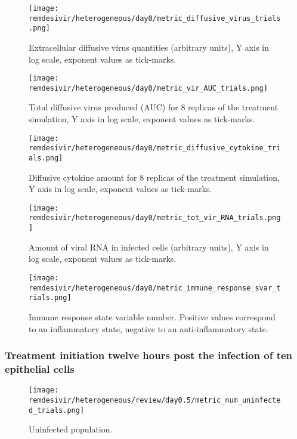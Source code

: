 \begin{figure}[H]
\texttt{[image: remdesivir/heterogeneous/day0/metric\_diffusive\_virus\_trials.png]}
\caption{Extracellular diffusive virus quantities (arbitrary units), Y axis in log scale, exponent values as tick-marks.\label{fig:app:hetero_regular:day0:diff_vir}}
\end{figure}

\begin{figure}[H]
\texttt{[image: remdesivir/heterogeneous/day0/metric\_vir\_AUC\_trials.png]}
\caption{Total diffusive virus produced (AUC) for 8 replicas of the treatment simulation, Y axis in log scale, exponent values as tick-marks.\label{fig:app:hetero_regular:day0:auc_vir}}
\end{figure}

\begin{figure}[H]
\texttt{[image: remdesivir/heterogeneous/day0/metric\_diffusive\_cytokine\_trials.png]}
\caption{Diffusive cytokine amount for 8 replicas of the treatment simulation, Y axis in log scale, exponent values as tick-marks.\label{fig:app:hetero_regular:day0:diff_cyto}}
\end{figure}

\begin{figure}[H]
\texttt{[image: remdesivir/heterogeneous/day0/metric\_tot\_vir\_RNA\_trials.png]}
\caption{Amount of viral RNA in infected cells (arbitrary units), Y axis in log scale, exponent values as tick-marks.\label{fig:app:hetero_regular:day0:vir_RNA}}
\end{figure}

\begin{figure}[H]
\texttt{[image: remdesivir/heterogeneous/day0/metric\_immune\_response\_svar\_trials.png]}
\caption{Immune response state variable number. Positive values correspond to an inflammatory state, negative to an anti-inflammatory state.\label{fig:app:hetero_regular:day0:immune_var}}
\end{figure}

\subsubsection{Treatment initiation twelve hours post the infection of ten epithelial cells}\label{sup:sec:extra_figures:hetero_regular:day0.5}


\begin{figure}[H]
\texttt{[image: remdesivir/heterogeneous/review/day0.5/metric\_num\_uninfected\_trials.png]}
\caption{Uninfected population.\label{fig:app:hetero_regular:day0.5:uninf}}
\end{figure}

